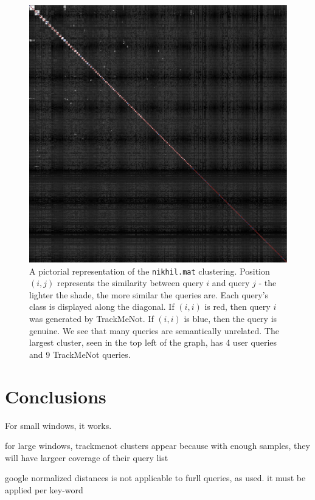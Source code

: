 \documentclass[11pt]{article}
\begin{document}
\begin{multicols}{2}
  \begin{figure}[h]
    \centering
    \includegraphics[width=\linewidth]{disco_nikhil_600.png}
    \caption{A pictorial representation of the \texttt{nikhil.mat}
      clustering. Position $(i,j)$ represents the similarity between
      query $i$ and query $j$ - the lighter the shade, the more
      similar the queries are. Each query's class is displayed along
      the diagonal. If $(i,i)$ is red, then query $i$ was generated by
      TrackMeNot. If $(i,i)$ is blue, then the query is genuine. We
      see that many queries are semantically unrelated. The largest
      cluster, seen in the top left of the graph, has 4 user queries
      and 9 TrackMeNot queries.}
    \label{fig:disco.nikhil}
  \end{figure}


\section{Conclusions}
\label{sec:conc}

For small windows, it works.

for large windows, trackmenot clusters appear because with enough samples, they will have largeer coverage of their query list

google normalized distances is not applicable to furll queries, as used. it must be applied per key-word



\end{multicols}
\end{document}
